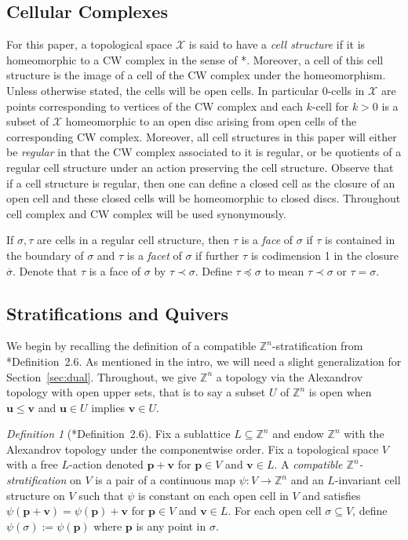 \documentclass{amsart}
\newcommand{\ZZ}{\mathbb{Z}}
\theoremstyle{remark}
\newtheorem{definition}[theorem]{Definition}
\begin{document}
\subsection*{Cellular Complexes}

For this paper, a topological space $\mathcal{X}$ is said to have a \emph{cell structure} if it is homeomorphic to a CW complex in the sense of \cite{Hat02}*{}. Moreover, a cell of this cell structure is the image of a cell of the CW complex under the homeomorphism. Unless otherwise stated, the cells will be open cells. In particular 0-cells in $\mathcal{X}$ are points corresponding to vertices of the CW complex and each $k$-cell for $k>0$ is a subset of $\mathcal{X}$ homeomorphic to an open disc arising from open cells of the corresponding CW complex. Moreover, all cell structures in this paper will either be \emph{regular} in that the CW complex associated to it is regular, or be quotients of a regular cell structure under an action preserving the cell structure. Observe that if a cell structure is regular, then one can define a closed cell as the closure of an open cell and these closed cells will be homeomorphic to closed discs. Throughout cell complex and CW complex will be used synonymously.

If $\sigma,\tau$ are cells in a regular cell structure, then $\tau$ is a \emph{face} of $\sigma$ if $\tau$ is contained in the boundary of $\sigma$ and $\tau$ is a \emph{facet} of $\sigma$ if further $\tau$ is codimension 1 in the closure $\overline{\sigma}$. Denote that $\tau$ is a face of $\sigma$ by $\tau\prec \sigma$. Define $\tau\preceq \sigma$ to mean $\tau\prec \sigma$ or $\tau=\sigma$.

\subsection*{Stratifications and Quivers}

We begin by recalling the definition of a compatible $\ZZ^n$-stratification from \cite{stratification-paper}*{Definition~2.6}. As mentioned in the intro, we will need a slight generalization for Section~\ref{sec:dual}. Throughout, we give $\ZZ^n$ a topology via the Alexandrov topology with open upper sets, that is to say a subset $U$ of $\ZZ^n$ is open when $\bm{u}\leq \bm{v}$ and $\bm{u}\in U$ implies $\bm{v}\in U$.

\begin{definition}[\cite{stratification-paper}*{Definition~2.6}]
  \label{def:stratification}
  Fix a sublattice $L\subseteq \ZZ^n$ and endow $\ZZ^n$ with the Alexandrov topology under the componentwise order.
  Fix a topological space $V$ with a free $L$-action denoted $\bm{p}+\bm{v}$ for $\bm{p}\in V$ and $\bm{v}\in L$.
  A \emph{compatible $\ZZ^n$-stratification} on $V$ is a pair of a continuous map $\psi: V \rightarrow \ZZ^n$
  and an $L$-invariant cell structure on $V$ such that $\psi$ is constant on each open cell in $V$
  and satisfies $\psi(\bm{p}+\bm{v})=\psi(\bm{p})+\bm{v}$ for $\bm{p}\in V$ and $\bm{v}\in L$.
  For each open cell $\sigma\subseteq V$, define $\psi(\sigma):=\psi(\bm{p})$ where $\bm{p}$ is any point in $\sigma$.
\end{definition}
\end{document}
